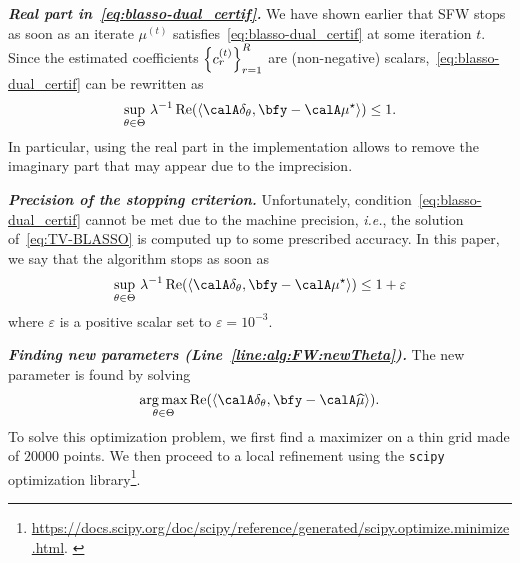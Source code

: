 \noindent
\textbf{\itshape Real part in~\eqref{eq:blasso-dual_certif}.}
We have shown earlier that SFW stops as soon as an iterate $\mu^{(t)}$ satisfies~\eqref{eq:blasso-dual_certif} at some iteration $t$.
Since the estimated coefficients $\kfamily{c_r^{(t)}}{r=1}^R$ are (non-negative) scalars,~\eqref{eq:blasso-dual_certif} can be rewritten as
\begin{equation}
	\sup_{\theta\in\Theta} \, \kinv{\lambda}\kRe\kparen{\kangle{
		\opObs{}\spike{\theta}, \bfy - \opObs{}\mu^\star
	}}
	\leq 1
	.
\end{equation}
In particular, using the real part in the implementation allows to remove the imaginary part that may appear due to the imprecision.


\vspace*{1em}
\noindent
\textbf{\itshape Precision of the stopping criterion.}
Unfortunately, condition~\eqref{eq:blasso-dual_certif} cannot be met due to the machine precision, \textit{i.e.}, the solution of~\eqref{eq:TV-BLASSO} is computed up to some prescribed accuracy.
In this paper, we say that the algorithm stops as soon as
\begin{equation}
	\sup_{\theta\in\Theta} \, \kinv{\lambda}\kRe\kparen{\kangle{
		\opObs{}\spike{\theta}, \bfy - \opObs{}\mu^\star
	}}
	\leq 1 + \varepsilon
\end{equation}
where $\varepsilon$ is a positive scalar set to $\varepsilon=10^{-3}$.



\vspace*{1em}
\noindent
\textbf{\itshape Finding new parameters (Line~\ref{line:alg:FW:newTheta}).}
The new parameter is found by solving
\begin{equation}
	\kargmax_{\theta\in\Theta} \kRe\kparen{\kangle{\opObs\spike{\theta}, \bfy - \opObs{}\widehat{\mu}}}
	.
\end{equation}
To solve this optimization problem, we first find a maximizer on a thin grid made of $20000$ points.
We then proceed to a local refinement using the \texttt{scipy} optimization library\footnote{ \url{https://docs.scipy.org/doc/scipy/reference/generated/scipy.optimize.minimize.html}. \label{note1}}.


